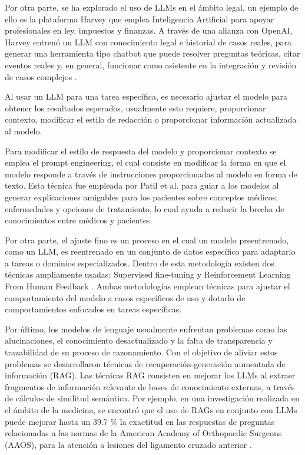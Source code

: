 Por otra parte, se ha explorado el uso de LLMs en el ámbito legal, un ejemplo de
ello es la plataforma Harvey que emplea Inteligencia Artificial para apoyar
profesionales en ley, impuestos y finanzas. A través de una alianza con OpenAI,
Harvey entrenó un LLM con conocimiento legal e historial de casos reales, para
generar una herramienta tipo chatbot que puede resolver preguntas teóricas, citar
eventos reales y, en general, funcionar como asistente en la integración y revisión
de casos complejos \cite{openai_customizing_2024}.

Al usar un LLM para una tarea específica, es necesario ajustar el modelo para
obtener los resultados esperados, usualmente esto requiere, proporcionar contexto,
modificar el estilo de redacción o proporcionar información actualizada al modelo.

Para modificar el estilo de respuesta del modelo y proporcionar contexto se
emplea el prompt engineering, el cual consiste en modificar la forma en que el
modelo responde a través de instrucciones proporcionadas al modelo en forma de
texto. Esta técnica fue empleada por Patil et al. \cite{patil_prompt_2024} para
guiar a los modelos al generar explicaciones amigables para los pacientes sobre
conceptos médicos, enfermedades y opciones de tratamiento, lo cual ayuda a reducir
la brecha de conocimientos entre médicos y pacientes.

Por otra parte, el ajuste fino es un proceso en el cual un modelo preentrenado,
como un LLM, es reentrenado en un conjunto de datos específico para adaptarlo a
tareas o dominios especializados. Dentro de esta metodología existen dos técnicas
ampliamente usadas: Supervised fine-tuning y Reinforcement Learning From Human
Feedback \cite{anisuzzaman_fine-tuning_2025}. Ambas metodologías emplean técnicas
para ajustar el comportamiento del modelo a casos específicos de uso y dotarlo de
comportamientos enfocados en tareas específicas.

Por último, los modelos de lenguaje usualmente enfrentan problemas como las
alucinaciones, el conocimiento desactualizado y la falta de transparencia y
trazabilidad de su proceso de razonamiento. Con el objetivo de aliviar estos
problemas se desarrollaron técnicas de recuperación-generación aumentada de
información (RAG). Las técnicas RAG consisten en mejorar los LLMs al extraer
fragmentos de información relevante de bases de conocimiento externas, a través
de cálculos de similitud semántica. Por ejemplo, en una investigación realizada
en el ámbito de la medicina, se encontró que el uso de RAGs en conjunto con LLMs
puede mejorar hasta un 39.7 \% la exactitud en las respuestas de preguntas
relacionadas a las normas de la American Academy of Orthopaedic Surgeons (AAOS),
para la atención a lesiones del ligamento cruzado anterior \cite{woo_custom_2025}.

